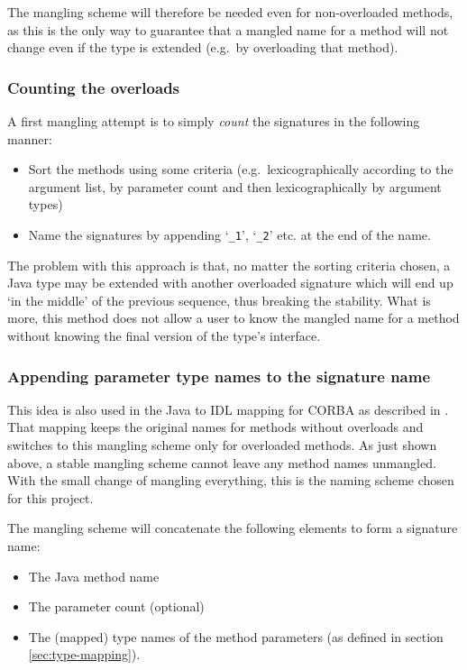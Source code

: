 The mangling scheme will therefore be needed even for non-overloaded methods,
as this is the only way to guarantee that a mangled name for a method
will not change even if the type is extended
(e.g.\ by overloading that method).


\subsubsection{Counting the overloads}
A first mangling attempt is to simply \emph{count} the signatures
in the following manner:
\begin{itemize}
\item Sort the methods using some criteria
(e.g.\ lexicographically according to the argument list,
by parameter count and then lexicographically by argument types)
\item Name the signatures by appending `\verb=_1=', `\verb=_2=' etc.
at the end of the name.
\end{itemize}
The problem with this approach is that, no matter the sorting criteria chosen,
a Java type may be extended with another overloaded signature
which will end up `in the middle' of the previous sequence,
thus breaking the stability.
What is more, this method does not allow a user to know
the mangled name for a method
without knowing the final version of the type's interface.


\subsubsection{Appending parameter type names to the signature name}
This idea is also used in the Java to \ac{IDL} mapping for \ac{CORBA}
as described in \citep[pg~10]{website:java2idl-mapping}.
That mapping keeps the original names for methods without overloads
and switches to this mangling scheme only for overloaded methods.
As just shown above, a stable mangling scheme cannot leave
any method names unmangled.
With the small change of mangling everything,
this is the naming scheme chosen for this project.

The mangling scheme will concatenate the following elements
to form a signature name:
\begin{itemize}
\item The Java method name
\item The parameter count (optional)
\item The (mapped) type names of the method parameters
(as defined in section \ref{sec:type-mapping}).
\end{itemize}

